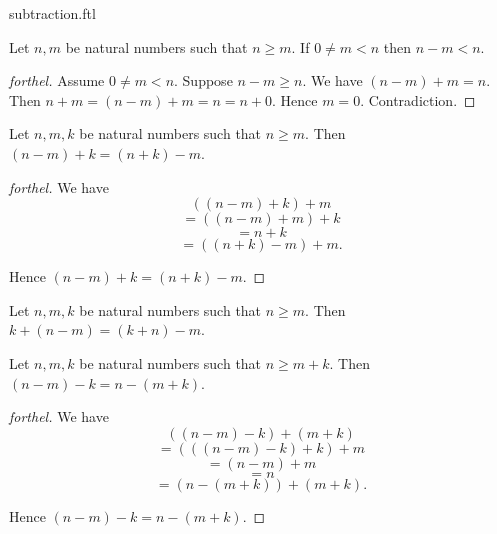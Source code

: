 \documentclass{naproche-library}
\begin{document}
\begin{smodule}{subtraction.ftl}
  \begin{proposition}[forthel,id=ARITHMETIC_05_1269537257291776]
    Let $n, m$ be natural numbers such that $n \geq m$.
    If $0 \neq m < n$ then $n - m < n$.
  \end{proposition}
  \begin{proof}[forthel]
    Assume $0 \neq m < n$.
    Suppose $n - m \geq n$.
    We have $(n - m) + m = n$.
    Then $n + m
      = (n - m) + m
      = n
      = n + 0$.
    Hence $m = 0$.
    Contradiction.
  \end{proof}

  \begin{proposition}[forthel,id=ARITHMETIC_05_4767595811045376]
    Let $n, m, k$ be natural numbers such that $n \geq m$.
    Then $(n - m) + k = (n + k) - m$.
  \end{proposition}
  \begin{proof}[forthel]
    We have
    \[  ((n - m) + k) + m       \]
    \[    = ((n - m) + m) + k   \]
    \[    = n + k               \]
    \[    = ((n + k) - m) + m.  \]

    Hence $(n - m) + k = (n + k) - m$.
  \end{proof}

  \begin{corollary}[forthel,id=ARITHMETIC_05_7578468875239424]
    Let $n, m, k$ be natural numbers such that $n \geq m$.
    Then $k + (n - m) = (k + n) - m$.
  \end{corollary}

  \begin{proposition}[forthel,id=ARITHMETIC_05_7595909347016704]
    Let $n, m, k$ be natural numbers such that $n \geq  m + k$.
    Then $(n - m) - k = n - (m + k)$.
  \end{proposition}
  \begin{proof}[forthel]
    We have
    \[  ((n - m) - k) + (m + k)       \]
    \[    = (((n - m) - k) + k) + m   \]
    \[    = (n - m) + m               \]
    \[    = n                         \]
    \[    = (n - (m + k)) + (m + k).  \]

    Hence $(n - m) - k = n - (m + k)$.
  \end{proof}
\end{smodule}
\end{document}
